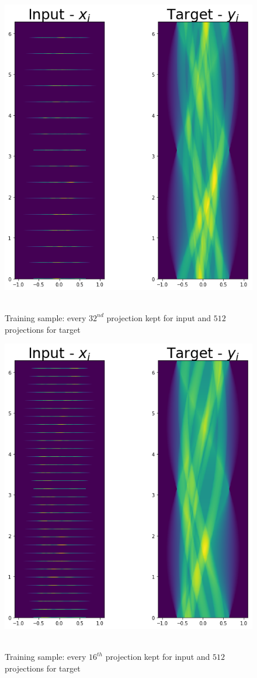 \begin{figure}[htb]
\centering
     \includegraphics[width=0.7 \textwidth]{figures/trainingsamples5} \
  \caption{Training sample: every $32^{nd}$ projection kept for input and $512$ projections for target}
  \label{trainingsamples5}
\end{figure}

\begin{figure}[htb]
\centering
     \includegraphics[width=0.7 \textwidth]{figures/trainingsamples6} \
  \caption{Training sample: every $16^{th}$ projection kept for input and $512$ projections for target}
  \label{trainingsamples6}
\end{figure}

